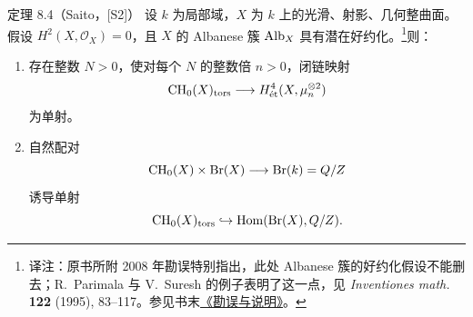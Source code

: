 \begin{statement}{定理 8.4（Saito，[S2]）}
设 $k$ 为局部域，$X$ 为 $k$ 上的光滑、射影、几何整曲面。假设 $H^2(X,\mathcal O_X)=0$，且 $X$ 的 Albanese 簇 $\operatorname{Alb}_X$ 具有潜在好约化。\footnote{译注：原书所附 2008 年勘误特别指出，此处 Albanese 簇的好约化假设不能删去；R.~Parimala 与 V.~Suresh 的例子表明了这一点，见 \textit{Inventiones math.} \textbf{122} (1995), 83--117。参见书末\hyperref[errata-ct]{《勘误与说明》}。}则：
\begin{enumerate}[label=(\alph*)]
\item 存在整数 $N>0$，使对每个 $N$ 的整数倍 $n>0$，闭链映射
\[
 \operatorname{CH}_0(X)_{\mathrm{tors}}\longrightarrow H^4_{\mathrm{\acute et}}(X,\mu_n^{\otimes2})
\]
为单射。
\item 自然配对
\[
 \operatorname{CH}_0(X)\times\operatorname{Br}(X)\longrightarrow\operatorname{Br}(k)=Q/Z
\]
诱导单射
\[
 \operatorname{CH}_0(X)_{\mathrm{tors}}\hookrightarrow\operatorname{Hom}(\operatorname{Br}(X),Q/Z).
\]
\end{enumerate}
\end{statement}
